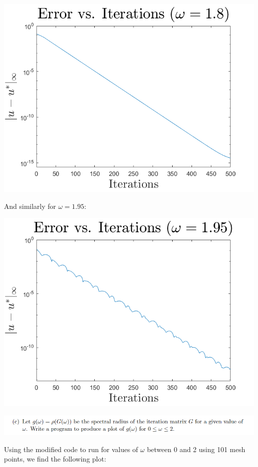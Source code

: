 \documentclass{article}
\begin{document}
\begin{center}
    \includegraphics[scale = 0.6]{omega1.8.png}
\end{center}
And similarly for $\omega = 1.95$:

\begin{center}
    \includegraphics[scale = 0.6]{omega1.95.png}
\end{center}

\includegraphics[scale = 0.8]{ex4.1c.PNG}
\newline

Using the modified code to run for values of $\omega$ between 0 and 2 using 101 mesh points, we find the following plot:
\end{document}
